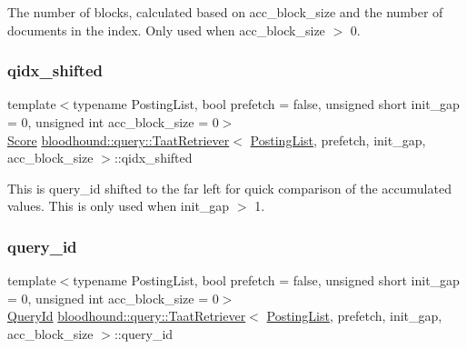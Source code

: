 The number of blocks, calculated based on acc\+\_\+block\+\_\+size and the number of documents in the index. Only used when acc\+\_\+block\+\_\+size $>$ 0. \mbox{\label{classbloodhound_1_1query_1_1TaatRetriever_aa27d16b326df60affe26e005f9abb4f6}} 
\subsubsection{\texorpdfstring{qidx\+\_\+shifted}{qidx\_shifted}}
{\footnotesize\ttfamily template$<$typename Posting\+List, bool prefetch = false, unsigned short init\+\_\+gap = 0, unsigned int acc\+\_\+block\+\_\+size = 0$>$ \\
\mbox{\hyperlink{structbloodhound_1_1Score}{Score}} \mbox{\hyperlink{classbloodhound_1_1query_1_1TaatRetriever}{bloodhound\+::query\+::\+Taat\+Retriever}}$<$ \mbox{\hyperlink{classbloodhound_1_1PostingList}{Posting\+List}}, prefetch, init\+\_\+gap, acc\+\_\+block\+\_\+size $>$\+::qidx\+\_\+shifted\hspace{0.3cm}{\ttfamily [protected]}}

This is query\+\_\+id shifted to the far left for quick comparison of the accumulated values. This is only used when init\+\_\+gap $>$ 1. \mbox{\label{classbloodhound_1_1query_1_1TaatRetriever_aa9a1b8ca0cb570bcffe6b6c68e8c2e20}} 
\subsubsection{\texorpdfstring{query\+\_\+id}{query\_id}}
{\footnotesize\ttfamily template$<$typename Posting\+List, bool prefetch = false, unsigned short init\+\_\+gap = 0, unsigned int acc\+\_\+block\+\_\+size = 0$>$ \\
\mbox{\hyperlink{namespacebloodhound_1_1query_aa67214af106292b2483995adea986b08}{Query\+Id}} \mbox{\hyperlink{classbloodhound_1_1query_1_1TaatRetriever}{bloodhound\+::query\+::\+Taat\+Retriever}}$<$ \mbox{\hyperlink{classbloodhound_1_1PostingList}{Posting\+List}}, prefetch, init\+\_\+gap, acc\+\_\+block\+\_\+size $>$\+::query\+\_\+id\hspace{0.3cm}{\ttfamily [protected]}}

